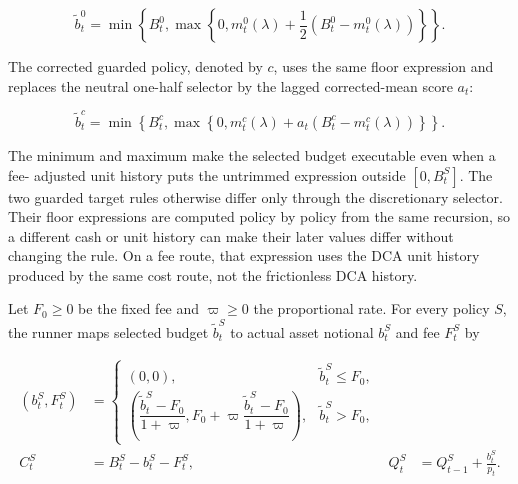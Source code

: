 \documentclass[12pt,a4paper,oneside]{report}
\begin{document}
\begin{equation}
  \widetilde b_t^0=\min\!\left\{B_t^0,
    \max\!\left\{0,m_t^0(\lambda)
      +\frac12\left(B_t^0-m_t^0(\lambda)\right)\right\}\right\}.
  \label{eq:method-neutral-policy}
\end{equation}

The corrected guarded policy, denoted by $c$, uses the same floor expression
and replaces the neutral one-half selector by the lagged corrected-mean score
$a_t$:

\begin{equation}
  \widetilde b_t^c=\min\!\left\{B_t^c,
    \max\!\left\{0,m_t^c(\lambda)
      +a_t\left(B_t^c-m_t^c(\lambda)\right)\right\}\right\}.
  \label{eq:method-corrected-policy}
\end{equation}

The minimum and maximum make the selected budget executable even when a fee-
adjusted unit history puts the untrimmed expression outside $[0,B_t^S]$. The
two guarded target rules otherwise differ only through the discretionary
selector. Their floor expressions are computed policy by policy from the same
recursion, so a different cash or unit history can make their later values
differ without changing the rule. On a fee route, that expression uses the
DCA unit history produced by the same cost route, not the frictionless DCA
history.

Let $F_0\geq0$ be the fixed fee and $\varpi\geq0$ the proportional rate. For
every policy $S$, the runner maps selected budget $\widetilde b_t^S$ to actual
asset notional $b_t^S$ and fee $F_t^S$ by

\begin{equation}
  \begin{aligned}
    (b_t^S,F_t^S)
    &=\begin{cases}
      (0,0), & \widetilde b_t^S\leq F_0,\\
      \left(\dfrac{\widetilde b_t^S-F_0}{1+\varpi},
        F_0+\varpi\dfrac{\widetilde b_t^S-F_0}{1+\varpi}\right),
        & \widetilde b_t^S>F_0,
    \end{cases}\\
    C_t^S&=B_t^S-b_t^S-F_t^S,
    &Q_t^S&=Q_{t-1}^S+\frac{b_t^S}{p_t}.
  \end{aligned}
  \label{eq:method-cost-execution}
\end{equation}
\end{document}
